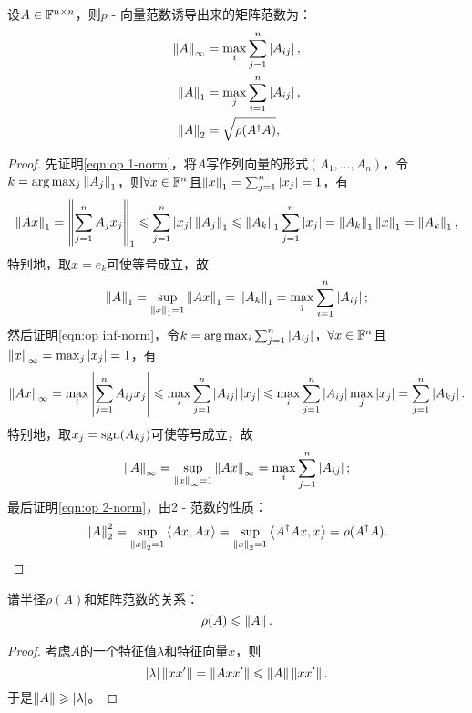 \begin{example}
    {}{}
    设$A\in\mathbb F^{n\times n}$，则$p$ - 向量范数诱导出来的矩阵范数为：
    \begin{subequations}
        \label{eqn:op norm}
        \begin{align}
            \label{eqn:op inf-norm}
            \left\lVert A\right\rVert_\infty&=\max_{i}\sum_{j=1}^n\left\lvert A_{ij}\right\rvert,\\
            \label{eqn:op 1-norm}
            \left\lVert A\right\rVert_1&=\max_{j}\sum_{i=1}^n\left\lvert A_{ij}\right\rvert,\\
            \label{eqn:op 2-norm}
            \left\lVert A\right\rVert_2&=\sqrt{\rho(A^\dagger A)},
        \end{align}
    \end{subequations}
    \begin{proof}
        先证明\eqref{eqn:op 1-norm}，将$A$写作列向量的形式$(A_1,\ldots,A_n)$，令$k=\arg\max_j\left\lVert A_j\right\rVert_1$，则$\forall x\in\mathbb F^n$且$\left\lVert x\right\rVert_1=\sum_{j=1}^n\left\lvert x_j\right\rvert=1$，有
        \[
            \left\lVert Ax\right\rVert_1=\left\lVert\sum_{j=1}^nA_jx_j\right\rVert_1\leqslant\sum_{j=1}^n\left\lvert x_j\right\rvert\left\lVert A_j\right\rVert_1\leqslant\left\lVert A_k\right\rVert_1\sum_{j=1}^n\left\lvert x_j\right\rvert=\left\lVert A_k\right\rVert_1\left\lVert x\right\rVert_1=\left\lVert A_k\right\rVert_1,
        \]
        特别地，取$x=e_k$可使等号成立，故
        \[
            \left\lVert A\right\rVert_1=\sup_{\left\lVert x\right\rVert_1=1}\left\lVert Ax\right\rVert_1=\left\lVert A_k\right\rVert_1=\max_{j}\sum_{i=1}^n\left\lvert A_{ij}\right\rvert;
        \]
        然后证明\eqref{eqn:op inf-norm}，令$k=\arg\max_i\sum_{j=1}^n\left\lvert A_{ij}\right\rvert$，$\forall x\in\mathbb F^n$且$\left\lVert x\right\rVert_\infty=\max_j\left\lvert x_j\right\rvert=1$，有
        \[
            \left\lVert Ax\right\rVert_\infty=\max_i\left\lvert\sum_{j=1}^nA_{ij}x_j\right\rvert\leqslant\max_i\sum_{j=1}^n\left\lvert A_{ij}\right\rvert\left\lvert x_j\right\rvert\leqslant\max_i\sum_{j=1}^n\left\lvert A_{ij}\right\rvert\max_j\left\lvert x_j\right\rvert=\sum_{j=1}^n\left\lvert A_{kj}\right\rvert.
        \]
        特别地，取$x_j=\operatorname{sgn}(A_{kj})$可使等号成立，故 
        \[
            \left\lVert A\right\rVert_\infty=\sup_{\left\lVert x\right\rVert_\infty=1}\left\lVert Ax\right\rVert_\infty=\max_i\sum_{j=1}^n\left\lvert A_{ij}\right\rvert;
        \]
        最后证明\eqref{eqn:op 2-norm}，由2 - 范数的性质：
        \[
            \left\lVert A\right\rVert_2^2=\sup_{\left\lVert x\right\rVert_2=1}\left\langle Ax,Ax\right\rangle=\sup_{\left\lVert x\right\rVert_2=1}\left\langle A^\dagger Ax,x\right\rangle=\rho(A^\dagger A).
            \qedhere
        \]
    \end{proof}
\end{example}

\begin{theorem}
    {}{}
    谱半径$\rho(A)$和矩阵范数的关系：
    \begin{equation}
        \rho(A)\leqslant\left\lVert A\right\rVert.
    \end{equation}
\end{theorem}

\begin{proof}
    考虑$A$的一个特征值$\lambda$和特征向量$x$，则 
    \[
        \left\lvert\lambda\right\rvert\left\lVert xx'\right\rVert=\left\lVert Axx'\right\rVert\leqslant\left\lVert A\right\rVert\left\lVert xx'\right\rVert.
    \]
    于是$\left\lVert A\right\rVert\geqslant\left\lvert\lambda\right\rvert$。
\end{proof}

